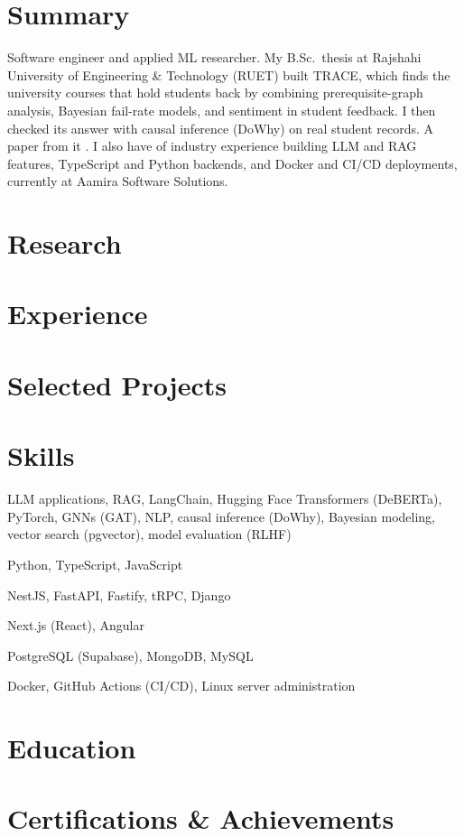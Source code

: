 \documentclass[10pt, a4paper]{article}
\begin{document}
\color{primary}
\cvheader

\section{Summary}
Software engineer and applied ML researcher. My B.Sc.\ thesis at Rajshahi University of Engineering \& Technology (RUET) built TRACE, which finds the university courses that hold students back by combining prerequisite-graph analysis, Bayesian fail-rate models, and sentiment in student feedback. I then checked its answer with causal inference (DoWhy) on real student records. A paper from it \factLakIs{}. I also have \factExpYears{} of industry experience building LLM and RAG features, TypeScript and Python backends, and Docker and CI/CD deployments, currently at Aamira Software Solutions.

\section{Research}


\section{Experience}




\section{Selected Projects}



\section{Skills}
\begin{description}[style=unboxed, leftmargin=0pt, itemsep=0.2ex]
    \item[AI/ML:] LLM applications, RAG, LangChain, Hugging Face Transformers (DeBERTa), PyTorch, GNNs (GAT), NLP, causal inference (DoWhy), Bayesian modeling, vector search (pgvector), model evaluation (RLHF)
    \item[Languages:] Python, TypeScript, JavaScript
    \item[Backend:] NestJS, FastAPI, Fastify, tRPC, Django
    \item[Frontend:] Next.js (React), Angular
    \item[Databases:] PostgreSQL (Supabase), MongoDB, MySQL
    \item[DevOps:] Docker, GitHub Actions (CI/CD), Linux server administration
\end{description}

\section{Education}


\section{Certifications \& Achievements}
\def\certindustry{}

\end{document}
